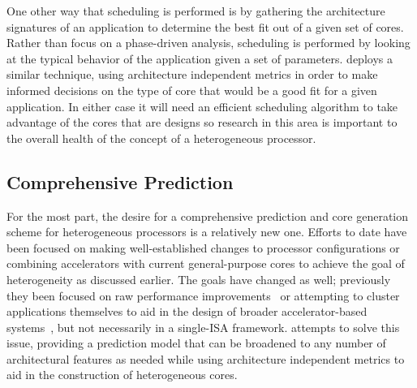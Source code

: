 One other way that scheduling is performed is by gathering the architecture signatures of an 
application to determine the best fit out of a given set of cores.~\cite{Shelepov09-SIGOPS-HeteroScheduling}
Rather than focus on a phase-driven analysis, scheduling is performed
by looking at the typical behavior of the application given a set of parameters.
\Ravan{} deploys a similar technique, using architecture independent metrics
in order to make informed decisions on the type of core that would be a good
fit for a given application. In either case it will need an efficient
scheduling algorithm to take advantage of the cores that are designs so research
in this area is important to the overall health of the concept of a heterogeneous
processor.



\subsection{Comprehensive Prediction}
For the most part, the desire for a comprehensive prediction and core 
generation scheme for heterogeneous processors is a relatively new one.
Efforts to date have been focused on making well-established changes to 
processor configurations or combining accelerators with current
general-purpose cores to achieve the goal of heterogeneity as discussed
earlier. The goals have changed as well; previously they been focused on raw performance 
improvements~\cite{Kumar06-PACT-SIHM} or attempting to cluster applications themselves to aid
in the design of broader accelerator-based systems~\cite{10x10}, but not necessarily
in a single-ISA framework. \Ravan{} attempts to solve this issue, providing a 
prediction model that can be broadened to any number of architectural features as needed while
using architecture independent metrics to aid in the construction of heterogeneous cores.



